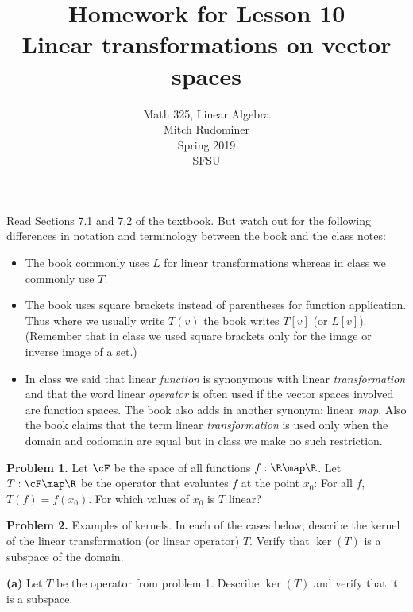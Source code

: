 \documentclass[oneside,12pt]{amsart}
\begin{document}
\title{Homework for Lesson 10 \\ Linear transformations on vector spaces}
\author{Math 325, Linear Algebra \\ Mitch Rudominer \\ Spring 2019 \\ SFSU }
\date{}

\maketitle

Read Sections 7.1 and 7.2 of the textbook. But watch out for the following
differences in notation and terminology between the book and the class notes:
\begin{itemize}
\item The book commonly uses $L$ for linear transformations whereas in class
we commonly use $T$.
\item The book uses square brackets instead of parentheses for function application.
Thus where we usually write $T(v)$ the book writes $T[v]$ (or $L[v]$).
(Remember that in class we used square brackets only for the image or inverse
image of a set.)
\item In class we said that linear \emph{function} is synonymous with linear
\emph{transformation} and that the word linear \emph{operator} is often used
if the vector spaces involved are function spaces. The book also adds in
another synonym: linear \emph{map}. Also the book claims that the term
linear \emph{transformation} is used only when the domain and codomain are
equal but in class we make no such restriction.
\end{itemize}

\bigskip

\textbf{Problem 1.} Let $\cF$ be the space of all functions $f:\R\map\R$.
Let $T:\cF\map\R$ be the operator that evaluates $f$ at the point $x_0$:
For all $f$, $T(f) = f(x_0)$. For which values of $x_0$ is $T$ linear?

\bigskip
\bigskip
\bigskip
\bigskip
\bigskip
\bigskip
\bigskip
\bigskip
\bigskip
\bigskip


\textbf{Problem 2.} Examples of kernels. In each of the cases below,
describe the kernel of the linear transformation (or linear operator) $T$.
Verify that $\ker(T)$ is a subspace of the domain.

\textbf{(a)} Let $T$ be the operator from problem 1. Describe $\ker(T)$ and
verify that it is a subspace.

\bigskip
\bigskip
\bigskip
\bigskip
\bigskip
\bigskip
\bigskip
\bigskip
\bigskip
\bigskip
\end{document}
